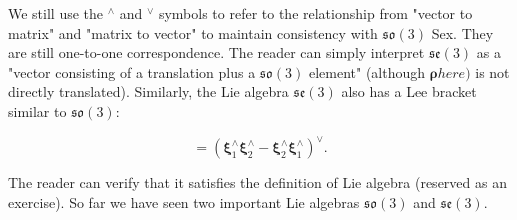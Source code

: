 We still use the $^\wedge$ and $^\vee$ symbols to refer to the relationship from "vector to matrix" and "matrix to vector" to maintain consistency with $\mathfrak{so}(3)$ Sex.
They are still one-to-one correspondence.
The reader can simply interpret $\mathfrak{se}(3)$ as a "vector consisting of a translation plus a $\mathfrak{so}(3)$ element" (although $\boldsymbol{\rho} here) $ is not directly translated).
Similarly, the Lie algebra $\mathfrak{se}(3)$ also has a Lee bracket similar to $\mathfrak{so}(3)$:

\begin{equation}
[ \boldsymbol{\xi}_1, \boldsymbol{\xi}_2 ] = \left( \boldsymbol{\xi}_1^\wedge \boldsymbol{\xi}_2^\wedge -\boldsymbol{\xi}_2^ \wedge \boldsymbol{\xi}_1^\wedge \right) ^\vee.
\end{equation}

The reader can verify that it satisfies the definition of Lie algebra (reserved as an exercise).
So far we have seen two important Lie algebras $\mathfrak{so}(3)$ and $\mathfrak{se}(3)$.

